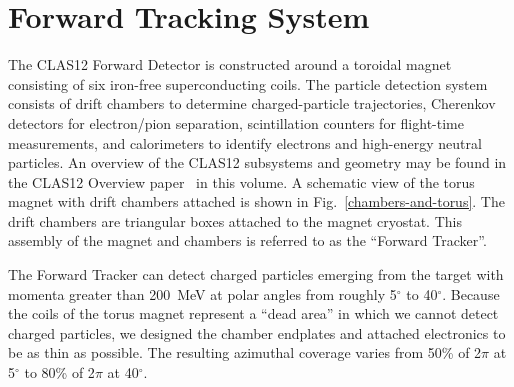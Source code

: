 \section{Forward Tracking System}
\label{overview}

The CLAS12 Forward Detector is constructed around a toroidal magnet consisting of six 
iron-free superconducting coils.  The particle detection system consists of drift 
chambers to determine charged-particle trajectories, Cherenkov detectors 
for electron/pion separation, scintillation counters for flight-time 
measurements, and calorimeters to identify electrons and high-energy neutral 
particles.  An overview of the CLAS12 subsystems and geometry may be found in the 
CLAS12 Overview paper~\cite{clas12-nim} in this volume.  A schematic view of the 
torus magnet with drift chambers
attached is shown in Fig.~\ref{chambers-and-torus}.   The drift chambers are 
triangular boxes attached to the magnet cryostat.  
This assembly of the magnet and chambers is referred to as the ``Forward Tracker''. 

The Forward Tracker can detect charged particles emerging from the target with
momenta greater than 200~MeV at polar angles from roughly 5$^{\circ}$ to 
40$^{\circ}$.  Because the coils of the torus magnet represent a ``dead area''
in which we cannot detect charged particles, we designed the chamber endplates
and attached electronics to be as thin as possible.  The resulting azimuthal
coverage varies from 50\% of 2$\pi$ at 5$^{\circ}$ to 80\% of 2$\pi$ at 40$^{\circ}$.

